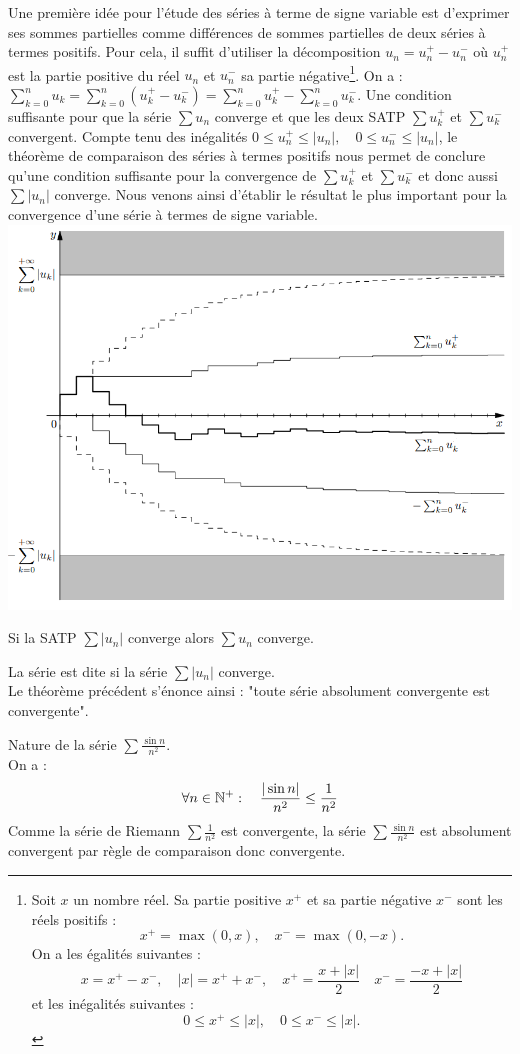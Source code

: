 \documentclass{book}
\begin{document}
Une première idée pour l'étude des séries à terme de signe variable est d'exprimer ses
sommes partielles comme différences de sommes partielles de deux séries à termes positifs.
Pour cela, il suffit d'utiliser la décomposition $u_n = u_n^+-u_n^-$ où $u_n^+$ est la partie positive
du réel $u_n$ et $u_n^-$
sa partie négative\footnote{Soit $x$ un nombre réel. Sa
partie positive $x^+$
 et sa partie négative $x^-$ sont les réels positifs :
$$x^+=\max(0,x), \quad x^-=\max(0,-x).$$
On a les égalités suivantes : 
$$x=x^+-x^-,\quad |x|=x^++x^-,\quad x^+=\frac{x+|x|}{2}\quad x^-=\frac{-x+|x|}{2}$$
et les inégalités suivantes :
$$0\leq x^+ \leq |x| , \quad 0\leq x^- \leq |x|.$$
}.
On a :
$ \sum_{k=0}^n u_k= \sum_{k=0}^n (u^+_k-u^-_k) = \sum_{k=0}^n u_k^+ -  \sum_{k=0}^n u_k^-.$
Une condition suffisante pour que la série $\sum u_n$ converge et que les deux SATP $\sum u_k^+$ et $\sum u_k^-$ convergent. 
Compte tenu des inégalités $0\leq u_n^+ \leq |u_n| , \quad 0\leq u_n^- \leq |u_n|$, le
théorème de comparaison des séries à termes positifs nous permet de conclure qu'une
condition suffisante pour la convergence de $\sum u_k^+$ et $\sum u_k^-$
et donc aussi $\sum|u_n|$ converge. Nous venons ainsi d'établir le résultat le plus important pour
la convergence d'une série à termes de signe variable.\\
\includegraphics[scale=0.8]{serie_numerique_fig_1.png}

\begin{Theoreme}
Si la SATP $\sum |u_n|$ converge alors $\sum u_n$ converge.
\end{Theoreme}
\begin{Definition}
La série est dite  si la série $\sum |u_n|$ converge.\\ 
Le théorème précédent s'énonce ainsi : "toute série absolument convergente est convergente".
\end{Definition}
\begin{Exemple}
Nature de la série $\sum \frac{\sin n }{n^2}$.\\
 On a :
$$\forall n \in\mathbb{N}^+:\quad \frac{|\sin n| }{n^2}\leq \frac{1}{n^2}$$
Comme la série de Riemann $\sum \frac{1}{n^2}$ est convergente, la série $\sum \frac{\sin n }{n^2}$ est absolument convergent par règle de comparaison donc convergente.
\end{Exemple}
\end{document}
